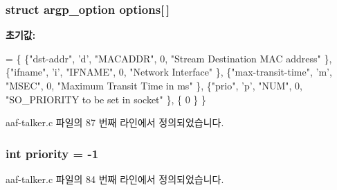\subsubsection[{\texorpdfstring{options}{options}}]{\setlength{\rightskip}{0pt plus 5cm}struct argp\+\_\+option options\mbox{[}$\,$\mbox{]}\hspace{0.3cm}{\ttfamily [static]}}\hypertarget{aaf-talker_8c_abc1fd3a47aea6a8944038c9100eb9135}{}\label{aaf-talker_8c_abc1fd3a47aea6a8944038c9100eb9135}
{\bfseries 초기값\+:}
\begin{DoxyCode}
= \{
    \{\textcolor{stringliteral}{"dst-addr"}, \textcolor{charliteral}{'d'}, \textcolor{stringliteral}{"MACADDR"}, 0, \textcolor{stringliteral}{"Stream Destination MAC address"} \},
    \{\textcolor{stringliteral}{"ifname"}, \textcolor{charliteral}{'i'}, \textcolor{stringliteral}{"IFNAME"}, 0, \textcolor{stringliteral}{"Network Interface"} \},
    \{\textcolor{stringliteral}{"max-transit-time"}, \textcolor{charliteral}{'m'}, \textcolor{stringliteral}{"MSEC"}, 0, \textcolor{stringliteral}{"Maximum Transit Time in ms"} \},
    \{\textcolor{stringliteral}{"prio"}, \textcolor{charliteral}{'p'}, \textcolor{stringliteral}{"NUM"}, 0, \textcolor{stringliteral}{"SO\_PRIORITY to be set in socket"} \},
    \{ 0 \}
\}
\end{DoxyCode}


aaf-\/talker.\+c 파일의 87 번째 라인에서 정의되었습니다.

\subsubsection[{\texorpdfstring{priority}{priority}}]{\setlength{\rightskip}{0pt plus 5cm}int priority = -\/1\hspace{0.3cm}{\ttfamily [static]}}\hypertarget{aaf-talker_8c_acec9ce2df15222151ad66fcb1d74eb9f}{}\label{aaf-talker_8c_acec9ce2df15222151ad66fcb1d74eb9f}


aaf-\/talker.\+c 파일의 84 번째 라인에서 정의되었습니다.

